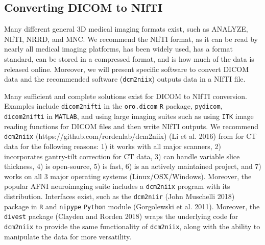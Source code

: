 \documentclass[]{elsarticle} %
\begin{document}
\hypertarget{converting-dicom-to-nifti}{%
\subsection{Converting DICOM to NIfTI}\label{converting-dicom-to-nifti}}

Many different general 3D medical imaging formats exist, such as ANALYZE, NIfTI, NRRD, and MNC. We recommend the NIfTI format, as it can be read by nearly all medical imaging platforms, has been widely used, has a format standard, can be stored in a compressed format, and is how much of the data is released online. Moreover, we will present specific software to convert DICOM data and the recommended software (\texttt{dcm2niix}) outputs data in a NIfTI file.

Many sufficient and complete solutions exist for DICOM to NIfTI conversion. Examples include \texttt{dicom2nifti} in the \texttt{oro.dicom} \texttt{R} package, \texttt{pydicom}, \texttt{dicom2nifti} in \texttt{MATLAB}, and using large imaging suites such as using \texttt{ITK} image reading functions for DICOM files and then write NIfTI outputs. We recommend \texttt{dcm2niix} (https://github.com/rordenlab/dcm2niix) (Li et al. 2016) from for CT data for the following reasons: 1) it works with all major scanners, 2) incorporates gantry-tilt correction for CT data, 3) can handle variable slice thickness, 4) is open-source, 5) is fast, 6) is an actively maintained project, and 7) works on all 3 major operating systems (Linux/OSX/Windows). Moreover, the popular AFNI neuroimaging suite includes a \texttt{dcm2niix} program with its distribution. Interfaces exist, such as the \texttt{dcm2niir} (John Muschelli 2018) package in \texttt{R} and \texttt{nipype} \texttt{Python} module (Gorgolewski et al. 2011). Moreover, the \texttt{divest} package (Clayden and Rorden 2018) wraps the underlying code for \texttt{dcm2niix} to provide the same functionality of \texttt{dcm2niix}, along with the ability to manipulate the data for more versatility.
\end{document}
